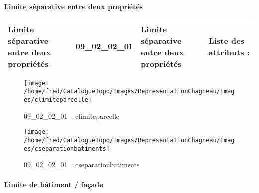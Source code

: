 \documentclass[12pt,titlepage]{book}
\begin{document}
\paragraph{Limite séparative entre deux propriétés}
\noindent
\vspace{\baselineskip}

\renewcommand{\arraystretch}{1.2}
\begin{supertabular}{|p{10cm}|c|p{13cm}|p{12cm}|}
 Limite séparative entre deux propriétés & 09\_02\_02\_01 & Limite séparative entre deux propriétés & Liste des attributs :
\begin{enumerate}
\end{enumerate}
\\
\hline
\end{supertabular}
\begin{figure}[h!]
  \hfill         %
  \begin{minipage}[t]{3cm}
    \begin{center}
      \texttt{[image: /home/fred/CatalogueTopo/Images/RepresentationChagneau/Images/climiteparcelle]}
      \caption[~09\_02\_02\_01]{\small{09\_02\_02\_01~:} \tiny{climiteparcelle}}\label{climiteparcelle}
    \end{center}
  \end{minipage}
  \begin{minipage}[t]{3cm}
    \begin{center}
      \texttt{[image: /home/fred/CatalogueTopo/Images/RepresentationChagneau/Images/cseparationbatiments]}
      \caption[~09\_02\_02\_01]{\small{09\_02\_02\_01~:} \tiny{cseparationbatiments}}\label{cseparationbatiments}
    \end{center}
  \end{minipage}
\end{figure}


\paragraph{Limite de bâtiment / façade}
\noindent
\vspace{\baselineskip}
\end{document}

